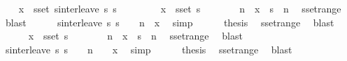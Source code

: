 \begin{isabellebody}
\ \ \isamarkupfalse%
\ {\isachardoublequoteopen}x\ {\isasymin}\ sset\ {\isacharparenleft}sinterleave\ s{}\ s{}{\isacharparenright}{\isachardoublequoteclose}\isanewline
\ \ \isamarkupfalse%
\isanewline
\ \ \ \ \isamarkupfalse%
\ {\isachardoublequoteopen}x\ {\isasymin}\ sset\ s{}{\isachardoublequoteclose}\isanewline
\ \ \ \ \isamarkupfalse%
\ \isamarkupfalse%
\ n\ \ {\isachardoublequoteopen}x\ {\isacharequal}\ s{}\ {\isacharbang}{\isacharbang}\ n{\isachardoublequoteclose}\ \isamarkupfalse%
\ sset{\isacharunderscore}range\ \isamarkupfalse%
\ blast\isanewline
\ \ \ \ \isamarkupfalse%
\ {\isachardoublequoteopen}sinterleave\ s{}\ s{}\ {\isacharbang}{\isacharbang}\ {\isacharparenleft}{}\ {\isacharasterisk}\ n{\isacharparenright}\ {\isacharequal}\ x{\isachardoublequoteclose}\ \isamarkupfalse%
\ simp\isanewline
\ \ \ \ \isamarkupfalse%
\ {\isacharquery}thesis\ \isamarkupfalse%
\ sset{\isacharunderscore}range\ \isamarkupfalse%
\ blast\isanewline
\ \ \isamarkupfalse%
\isanewline
\ \ \ \ \isamarkupfalse%
\ {\isachardoublequoteopen}x\ {\isasymin}\ sset\ s{}{\isachardoublequoteclose}\isanewline
\ \ \ \ \isamarkupfalse%
\ \isamarkupfalse%
\ n\ \ {\isachardoublequoteopen}x\ {\isacharequal}\ s{}\ {\isacharbang}{\isacharbang}\ n{\isachardoublequoteclose}\ \isamarkupfalse%
\ sset{\isacharunderscore}range\ \isamarkupfalse%
\ blast\isanewline
\ \ \ \ \isamarkupfalse%
\ {\isachardoublequoteopen}sinterleave\ s{}\ s{}\ {\isacharbang}{\isacharbang}\ {\isacharparenleft}{}\ {\isacharasterisk}\ n\ {\isacharplus}\ {}{\isacharparenright}\ {\isacharequal}\ x{\isachardoublequoteclose}\ \isamarkupfalse%
\ simp\isanewline
\ \ \ \ \isamarkupfalse%
\ {\isacharquery}thesis\ \isamarkupfalse%
\ sset{\isacharunderscore}range\ \isamarkupfalse%
\ blast\isanewline
\ \ \isamarkupfalse%
\isanewline
{}\isamarkupfalse%
%
\endisatagproof
{\isafoldproof}%
%
\isadelimproof
%
\endisadelimproof
%
\isadelimdocument
%
\endisadelimdocument
%
\isatagdocument
%
\isamarkuptrue%

\end{isabellebody}
